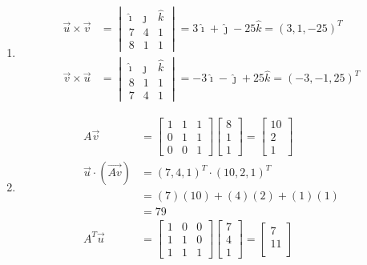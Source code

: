 \begin{Answer}
\begin{enumerate}[label=(\alph*)]
\item 
\begin{align*}
\vec{u} \times \vec{v} &= 
\begin{vmatrix}
\hat{\imath} & \hat{\jmath} & \hat{k}\\
7 & 4 & 1\\
8 & 1 & 1    
\end{vmatrix}
= 3\hat{\imath} + \hat{\jmath} - 25\hat{k} = (3, 1, -25)^T \\
\vec{v} \times \vec{u} &=
\begin{vmatrix}
\hat{\imath} & \hat{\jmath} & \hat{k}\\
8 & 1 & 1 \\  
7 & 4 & 1
\end{vmatrix}
= -3\hat{\imath} - \hat{\jmath} + 25\hat{k} = (-3, -1, 25)^T
\end{align*} 
\item 
\begin{align*}
A\vec{v} &= 
\begin{bmatrix}
1 & 1 & 1\\
0 & 1 & 1\\
0 & 0 & 1
\end{bmatrix}
\begin{bmatrix}
8 \\
1 \\
1
\end{bmatrix}
=
\begin{bmatrix}
10 \\
2 \\
1
\end{bmatrix} \\
\vec{u} \cdot (\vec{Av}) 
&= (7, 4, 1)^T \cdot (10, 2, 1)^T \\
&= (7)(10) + (4)(2) + (1)(1) \\
&= 79 \\
A^T\vec{u} &= 
\begin{bmatrix}
1 & 0 & 0\\
1 & 1 & 0\\
1 & 1 & 1
\end{bmatrix}
\begin{bmatrix}
7 \\ 
4 \\
1
\end{bmatrix}
=
\begin{bmatrix}
7 \\
11 \\

\end{bmatrix}
\end{align*}
\end{enumerate}
\end{Answer}
